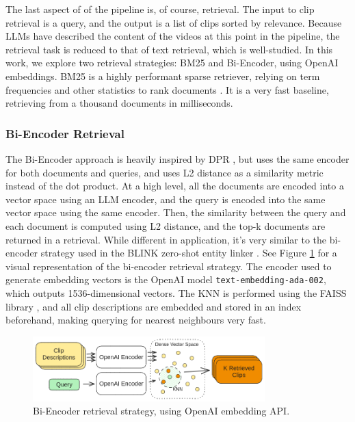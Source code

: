 The last aspect of of the pipeline is, of course, retrieval.
The input to clip retrieval is a query, and the output is a list of clips sorted by relevance.
Because LLMs have described the content of the videos at this point in the pipeline, the retrieval task is reduced to that of text retrieval, which is well-studied.
In this work, we explore two retrieval strategies: BM25 and Bi-Encoder, using OpenAI embeddings.
BM25 is a highly performant sparse retriever, relying on term frequencies and other statistics to rank documents \cite{bm25}. %
It is a very fast baseline, retrieving from a thousand documents in milliseconds.

\subsubsection{Bi-Encoder Retrieval}
The Bi-Encoder approach is heavily inspired by DPR \cite{dpr}, but uses the same encoder for both documents and queries, and uses L2 distance as a similarity metric instead of the dot product.
At a high level, all the documents are encoded into a vector space using an LLM encoder, and the query is encoded into the same vector space using the same encoder.
Then, the similarity between the query and each document is computed using L2 distance, and the top-k documents are returned in a retrieval.
While different in application, it's very similar to the bi-encoder strategy used in the BLINK zero-shot entity linker \cite{blink}.
See Figure \ref{fig:bienc} for a visual representation of the bi-encoder retrieval strategy.
The encoder used to generate embedding vectors is the OpenAI model \verb|text-embedding-ada-002|, which outputs 1536-dimensional vectors.
The KNN is performed using the FAISS library \cite{faiss}, and all clip descriptions are embedded and stored in an index beforehand, making querying for nearest neighbours very fast.

\begin{figure}
      \centering
      \includegraphics[width=0.8\textwidth]{figures/openai_DPR.png}
      \caption{Bi-Encoder retrieval strategy, using OpenAI embedding API.}
      \label{fig:bienc}
\end{figure}

